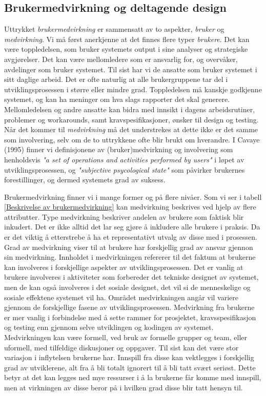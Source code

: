 \subsection{Brukermedvirkning og deltagende design}
\label{chp: medvirkning}

Uttrykket \emph{brukermedvirkning} er sammensatt av to aspekter, \emph{bruker} og \emph{medvirkning}.
Vi må først anerkjenne at det finnes flere typer \emph{brukere}. Det kan være toppledelsen, som bruker systemets output i sine analyser og strategiske avgjørelser. Det kan være mellomledere som er ansvarlig for, og overvåker, avdelinger som bruker systemet. Til sist har vi de ansatte som bruker systemet i sitt daglige arbeid. Det er ofte naturlig at alle brukergruppene tar del i utviklingsprosessen i større eller mindre grad. Toppledelsen må kanskje godkjenne systemet, og kan ha meninger om hva slags rapporter det skal generere. Mellomledelsen og andre ansatte kan bidra med innsikt i dagens arbeidsrutiner, problemer og workarounds, samt kravspesifikasjoner, ønsker til design og testing. Når det kommer til \emph{medvirkning} må det understrekes at dette ikke er det samme som involvering, selv om de to uttrykkene ofte blir brukt om hverandre. I Cavaye (1995) finner vi definisjonene av (bruker)medvirkning og involvering som henholdsvis \emph{"a set of operations and activities performed by users"} i løpet av utviklingsprosessen, og \emph{"subjective psycological state"} som påvirker brukernes forestillinger, og dermed systemets grad av suksess.

\noindent
Brukermedvirkning finner vi i mange former og på flere nivåer. Som vi ser i tabell \ref{Beskrivelse av brukermedvirkning} kan medvirkning beskrives ved hjelp av flere attributter. 
Type medvirkning beskriver andelen av brukere som faktisk blir inkudert. Det er ikke alltid det lar seg gjøre å inkludere alle brukere i praksis. Da er det viktig å etterstrebe å ha et representativt utvalg av disse med i prosessen. 
Grad av medvirkning viser til at brukere har forskjellig grad av ansvar gjennon sin medvirkning. 
Innholdet i medvirkningen refererer til det faktum at brukerne kan involveres i forskjellige aspekter av utviklingsprosessen. Det er vanlig at brukere involveres i aktiviteter som forbereder det tekniske designet av systemet, men de kan også involveres i det sosiale designet, det vil si de menneskelige og sosiale effektene systemet vil ha. 
Området medvirkningen angår vil variere gjennom de forskjellige fasene av utviklingsprosessen. Medvirkning fra brukerne er mer vanlig i forbindelse med å sette rammer for prosjektet, kravsspesifikasjon og testing enn gjennom selve utviklingen og kodingen av systemet. Medvirkningen kan være formell, ved bruk av formelle grupper og team, eller uformell, med tilfeldige diskusjoner og oppgaver. Til sist kan det være stor variasjon i inflytelsen brukerne har. Innspill fra disse kan vektlegges i forskjellig grad av utviklerene, alt fra å bli totalt ignorert til å bli tatt svært seriøst. Dette betyr at det kan legges ned mye ressurser i å la brukerne får komme med innspill, men at virkningen av disse beror på i hvilken grad disse blir tatt hensyn til.

